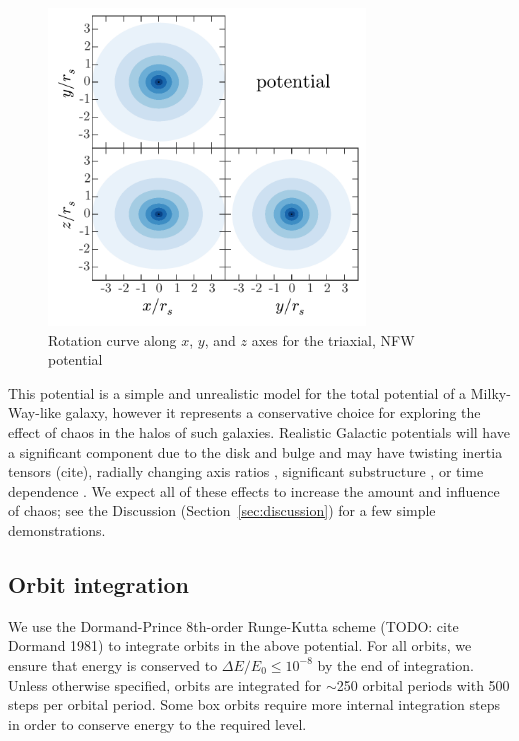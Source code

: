 \documentclass[letterpaper,12pt,preprint]{aastex}
\begin{document}
\begin{figure}[!h]
\begin{center}
\includegraphics[width=0.75\textwidth]{figures/potential.pdf}
\caption{Rotation curve along $x$, $y$, and $z$ axes for the triaxial, NFW potential } \label{fig:potential}
\end{center}
\end{figure}

This potential is a simple and unrealistic model for the total potential of a Milky-Way-like galaxy, however it represents a conservative choice for exploring the effect of chaos in the halos of such galaxies. Realistic Galactic potentials will have a significant component due to the disk and bulge and may have twisting inertia tensors (cite), radially changing axis ratios \citep[e.g.,][]{kazantzidis04,debattista08,veraciro11}, significant substructure \citep{moore98,zemp09}, or time dependence \citep[either from bulk rotation, mass growth, mergers, etc.][]{bailin05}. We expect all of these effects to increase the amount and influence of chaos; see the Discussion (Section~\ref{sec:discussion}) for a few simple demonstrations.

\subsection{Orbit integration}\label{sec:integration}

We use the Dormand-Prince 8th-order Runge-Kutta scheme (TODO: cite Dormand 1981) to integrate orbits in the above potential. For all orbits, we ensure that energy is conserved to $\Delta E/E_0 \leq 10^{-8}$ by the end of integration. Unless otherwise specified, orbits are integrated for $\sim$250 orbital periods with 500 steps per orbital period. Some box orbits require more internal integration steps in order to conserve energy to the required level. 
\end{document}
